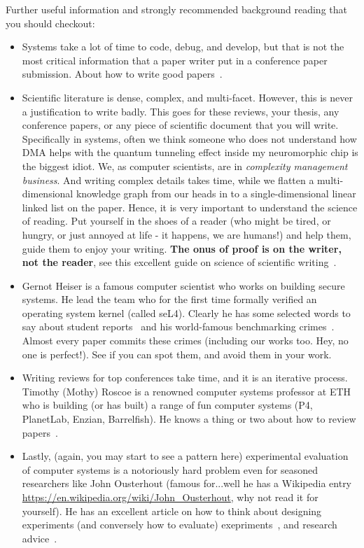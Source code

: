 \documentclass[sigconf,10pt, screen]{acmart}
\begin{document}
Further useful information and strongly recommended background reading that you should checkout:
\begin{itemize}    
    \item Systems take a lot of time to code, debug, and develop, but that is not the most critical information that a paper writer put in a conference paper submission. About how to write good papers~\cite{2023-usenix-good-papers}.    
    \item Scientific literature is dense, complex, and multi-facet. However, this is never a justification to write badly. This goes for these reviews, your thesis, any conference papers, or any piece of scientific document that you will write. Specifically in systems, often we think someone who does not understand how DMA helps with the quantum tunneling effect inside my neuromorphic chip is the biggest idiot. We, as computer scientists, are in \textit{complexity management business}. And writing complex details takes time, while we flatten a multi-dimensional knowledge graph from our heads in to a single-dimensional linear linked list on the paper. Hence, it is very important to understand the science of reading. Put yourself in the shoes of a reader (who might be tired, or hungry, or just annoyed at life - it happens, we are humans!) and help them, guide them to enjoy your writing. \textbf{The onus of proof is on the writer, not the reader}, see this excellent guide on science of scientific writing~\cite{2023-scientific-writing}.
    \item Gernot Heiser is a famous computer scientist who works on building secure systems. He lead the team who for the first time formally verified an operating system kernel (called seL4). Clearly he has some selected words to say about student reports~\cite{2023-gheiser-student-reports} and his world-famous benchmarking crimes~\cite{2023-gheiser-bcrimes}. Almost every paper commits these crimes (including our works too. Hey, no one is perfect!). See if you can spot them, and avoid them in your work.
    \item Writing reviews for top conferences take time, and it is an iterative process. Timothy (Mothy) Roscoe is a renowned computer systems professor at ETH who is building (or has built) a range of fun computer systems (P4, PlanetLab, Enzian, Barrelfish). He knows a thing or two about how to review papers~\cite{2023-eth-mothy-review}.
    \item Lastly, (again, you may start to see a pattern here) experimental evaluation of computer systems is a notoriously hard problem even for seasoned researchers like John Ousterhout (famous for...well he has a Wikipedia entry \url{https://en.wikipedia.org/wiki/John_Ousterhout}, why not read it for yourself). He has an excellent article on how to think about designing experiments (and conversely how to evaluate) exepriments~\cite{2018-cacm-level-deep-measure}, and research advice~\cite{2023-ousterhout-sayings}.
    \end{itemize}
\newpage
\end{document}
